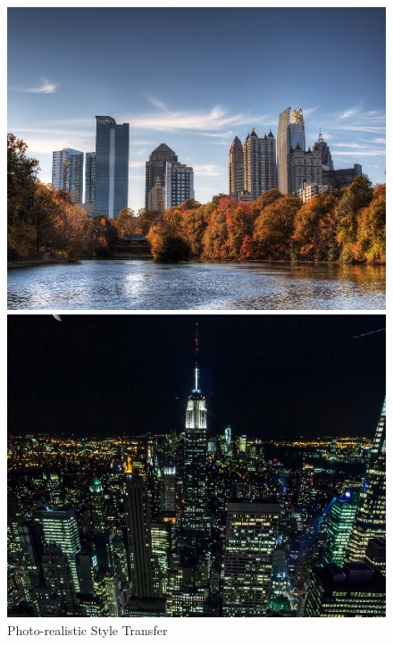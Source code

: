 \documentclass{article}
\begin{document}
\begin{figure}[htp]
\centering
\caption{Photo-realistic Style Transfer}
\label{fig:photo-realistic-style-transfer}
    \begin{minipage}{0.3\linewidth}
    \includegraphics[width=\textwidth]{img/photo-transfer/p}
    \end{minipage}
    \begin{minipage}{0.3\linewidth}
    \includegraphics[width=\textwidth]{img/photo-transfer/a}
    \end{minipage}

\end{figure}
\end{document}
